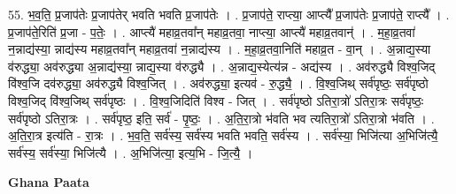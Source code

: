 \documentclass[17pt]{extarticle}
\begin{document}
55. भ॒व॒ति॒ प्र॒जाप॑तेः प्र॒जाप॑तेर् भवति भवति प्र॒जाप॑तेः । . प्र॒जाप॑ते॒ राप्त्या॒ आप्त्यै᳚ प्र॒जाप॑तेः प्र॒जाप॑ते॒ राप्त्यै᳚ । . प्र॒जाप॑ते॒रिति॑ प्र॒जा - प॒तेः॒ । . आप्त्यै॑ महाव्र॒तवा᳚न् महाव्र॒तवा॒ नाप्त्या॒ आप्त्यै॑ महाव्र॒तवान्॑ । . म॒हा॒व्र॒तवा॑ न॒न्नाद्य॑स्या॒ न्नाद्य॑स्य महाव्र॒तवा᳚न् महाव्र॒तवा॑ न॒न्नाद्य॑स्य । . म॒हा॒व्र॒तवा॒निति॑ महाव्र॒त - वा॒न् । . अ॒न्नाद्य॒स्या व॑रुद्ध्या॒ अव॑रुद्ध्या अ॒न्नाद्य॑स्या॒ न्नाद्य॒स्या व॑रुद्ध्यै । . अ॒न्नाद्य॒स्येत्य॑न्न - अद्य॑स्य । . अव॑रुद्ध्यै विश्व॒जिद् वि॑श्व॒जि दव॑रुद्ध्या॒ अव॑रुद्ध्यै विश्व॒जित् । . अव॑रुद्ध्या॒ इत्यव॑ - रु॒द्ध्यै॒ । . वि॒श्व॒जिथ् सर्व॑पृष्ठः॒ सर्व॑पृष्ठो विश्व॒जिद् वि॑श्व॒जिथ् सर्व॑पृष्ठः । . वि॒श्व॒जिदिति॑ विश्व - जित् । . सर्व॑पृष्ठो ऽतिरा॒त्रो॑ ऽतिरा॒त्रः सर्व॑पृष्ठः॒ सर्व॑पृष्ठो ऽतिरा॒त्रः । . सर्व॑पृष्ठ॒ इति॒ सर्व॑ - पृ॒ष्ठः॒ । . अ॒ति॒रा॒त्रो भ॑वति भव त्यतिरा॒त्रो॑ ऽतिरा॒त्रो भ॑वति । . अ॒ति॒रा॒त्र इत्य॑ति - रा॒त्रः । . भ॒व॒ति॒ सर्व॑स्य॒ सर्व॑स्य भवति भवति॒ सर्व॑स्य । . सर्व॑स्या॒ भिजि॑त्या अ॒भिजि॑त्यै॒ सर्व॑स्य॒ सर्व॑स्या॒ भिजि॑त्यै । . अ॒भिजि॑त्या॒ इत्य॒भि - जि॒त्यै॒ । \newline

\textbf{Ghana Paata } \newline
\end{document}
